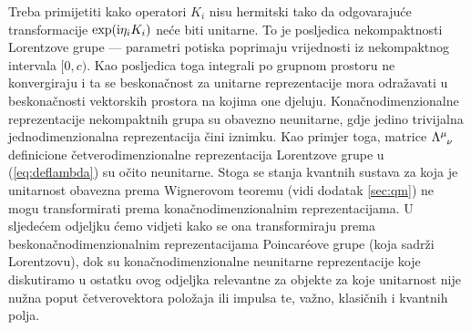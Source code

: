 Treba primijetiti kako operatori $K_i$ nisu hermitski tako da odgovarajuće
transformacije $\exp(\textrm{i}\eta_i K_i)$ neće biti unitarne. To je posljedica
nekompaktnosti Lorentzove grupe --- parametri potiska poprimaju
vrijednosti iz nekompaktnog intervala $[0,c)$. 
Kao posljedica toga integrali po grupnom prostoru ne konvergiraju i ta se beskonačnost
za unitarne reprezentacije mora odražavati u beskonačnosti vektorskih prostora
na kojima one djeluju. Konačnodimenzionalne reprezentacije nekompaktnih grupa
su obavezno neunitarne, gdje jedino trivijalna jednodimenzionalna reprezentacija
čini iznimku. Kao primjer toga, matrice $\tensor{\Lambda}{^\mu_\nu}$
definicione četverodimenzionalne reprezentacija Lorentzove grupe u (\ref{eq:deflambda}) 
su očito neunitarne. Stoga se stanja kvantnih sustava za koja je 
unitarnost obavezna prema Wignerovom teoremu (vidi dodatak \ref{sec:qm}) ne mogu transformirati
prema konačnodimenzionalnim reprezentacijama. U sljedećem odjeljku ćemo
vidjeti kako se ona transformiraju prema beskonačnodimenzionalnim
reprezentacijama Poincar\'{e}ove grupe (koja sadrži Lorentzovu),
dok su konačnodimenzionalne neunitarne reprezentacije koje diskutiramo
u ostatku ovog odjeljka relevantne za objekte za koje unitarnost
nije nužna poput četverovektora položaja ili impulsa te, važno, klasičnih
i kvantnih polja.


